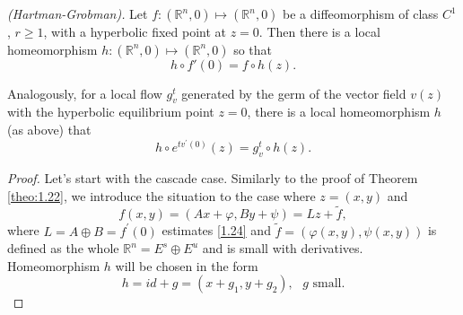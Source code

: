\begin{theorem}\emph{(Hartman-Grobman).}\label{theo:1.23}
	Let $f:\left( \mathbb{R}^{n},0\right) \longmapsto \left( \mathbb{R}^{n},0\right) $ be a diffeomorphism of class $C^1$, $r\geq 1$, with a hyperbolic fixed point at $z=0$. Then there is a local homeomorphism $ h: \left (\mathbb {R} ^ {n}, 0 \right) \longmapsto \left( \mathbb{R}^{n},0\right) $ so that
	\begin{equation}
	\label{1.27}
	h\circ f'(0)=f\circ h(z).
	\end{equation}
	
	Analogously, for a local flow $ g_ {v} ^ {t} $ generated by the germ of the vector field $ v \left (z \right)$ with the hyperbolic equilibrium point $ z = 0 $, there is a local homeomorphism $ h $ (as above) that
	\begin{equation}
	\label{1.28}
	h\circ e^{tv^{\prime }(0)}(z)=g_{v}^{t}\circ h(z).
	\end{equation}
	
	\begin{proof}
		Let's start with the cascade case. Similarly to the proof of Theorem \ref{theo:1.22}, we introduce the situation to the case where $ z = \left (x, y \right) $ and
		$$
		f(x,y)=(Ax+\varphi ,By+\psi )=Lz+\tilde{f},
		$$
		where $L=A\oplus B=f^{\prime }(0)$ estimates \eqref{1.24} and $\tilde{f}=\left( \varphi (x,y),\psi (x,y)\right) $ is defined as the whole $ \mathbb {R} ^ {n} = E ^ {s} \oplus E ^ {u} $ and is small with derivatives. Homeomorphism $ h $ will be chosen in the form
		\begin{equation}
		\label{1.29}
		h=id+g=(x+g_{1},y+g_{2}),\text{ \ \ }g\text{\ small.}
		\end{equation}
		

\end{proof}
\end{theorem}

